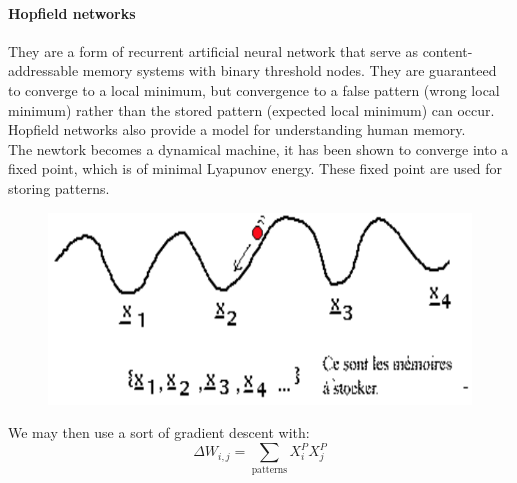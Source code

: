 \paragraph{Hopfield networks} They are a form of recurrent artificial neural network that serve as content-addressable memory systems with binary threshold nodes. They are guaranteed to converge to a local minimum, but convergence to a false pattern (wrong local minimum) rather than the stored pattern (expected local minimum) can occur. Hopfield networks also provide a model for understanding human memory.\\
\linebreak
The newtork becomes a dynamical machine, it has been shown to converge into a fixed point, which is of minimal Lyapunov energy. These fixed point are used for storing patterns.
\begin{figure}[h]
    \centering
    \includegraphics[width=0.35\linewidth]{img/mempatterns}
\end{figure}
We may then use a sort of gradient descent with:
\begin{equation*}
    \Delta W_{i, j} = \sum_{\text{patterns}} X^P_i X^P_j
\end{equation*}

